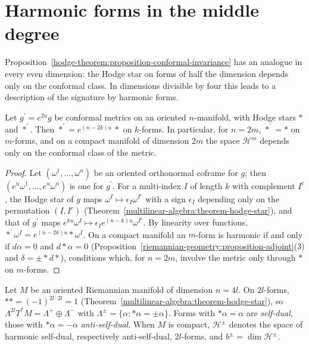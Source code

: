 \section{Harmonic forms in the middle degree}\label{hodge-theorem:section-middle-degree}

Proposition~\ref{hodge-theorem:proposition-conformal-invariance} has an analogue in every even dimension: the Hodge star on forms of half the dimension depends only on the conformal class. In dimensions divisible by four
this leads to a description of the signature by harmonic forms.

\begin{proposition}\label{hodge-theorem:proposition-conformal-star}
Let $g^{\prime} = e^{2u}g$ be conformal metrics on an oriented $n$-manifold, with Hodge stars $*$ and $*^{\prime}$. Then $*^{\prime} = e^{(n - 2k)u}\,*$ on $k$-forms. In particular, for $n = 2m$, $*^{\prime} = *$ on $m$-forms, and
on a compact manifold of dimension $2m$ the space $\mathcal{H}^m$ depends only on the conformal class of the metric.
\end{proposition}

\begin{proof}
Let $(\omega^1, \ldots, \omega^n)$ be an oriented orthonormal coframe for $g$; then $(e^u\omega^1, \ldots, e^u\omega^n)$ is one for $g^{\prime}$. For a multi-index $I$ of length $k$ with complement $I^c$, the
Hodge star of $g$ maps $\omega^I \mapsto \epsilon_I\omega^{I^c}$ with a sign $\epsilon_I$ depending only on the permutation $(I, I^c)$ (Theorem~\ref{multilinear-algebra:theorem-hodge-star}), and that of $g^{\prime}$ maps
$e^{ku}\omega^I \mapsto \epsilon_Ie^{(n-k)u}\omega^{I^c}$. By linearity over functions, $*^{\prime}\omega^I = e^{(n-2k)u}*\omega^I$. On a compact manifold an $m$-form is harmonic if and only if $d\alpha = 0$ and
$d{*}\alpha = 0$ (Proposition~\ref{riemannian-geometry:proposition-adjoint}(3) and $\delta = \pm{*}d{*}$), conditions which, for $n = 2m$, involve the metric only through $*$ on $m$-forms.
\end{proof}

\begin{definition}\label{hodge-theorem:definition-self-dual}
Let $M$ be an oriented Riemannian manifold of dimension $n = 4l$. On $2l$-forms, $** = (-1)^{2l \cdot 2l} = 1$ (Theorem~\ref{multilinear-algebra:theorem-hodge-star}), so $\Lambda^{2l}T^*M = \Lambda^+ \oplus \Lambda^-$ with
$\Lambda^{\pm} = \{\alpha : *\alpha = \pm\alpha\}$. Forms with $*\alpha = \alpha$ are \emph{self-dual}, those with $*\alpha = -\alpha$ \emph{anti-self-dual}. When $M$ is compact, $\mathcal{H}^\pm$ denotes the space of
harmonic self-dual, respectively anti-self-dual, $2l$-forms, and $b^\pm = \dim\mathcal{H}^\pm$.
\end{definition}


